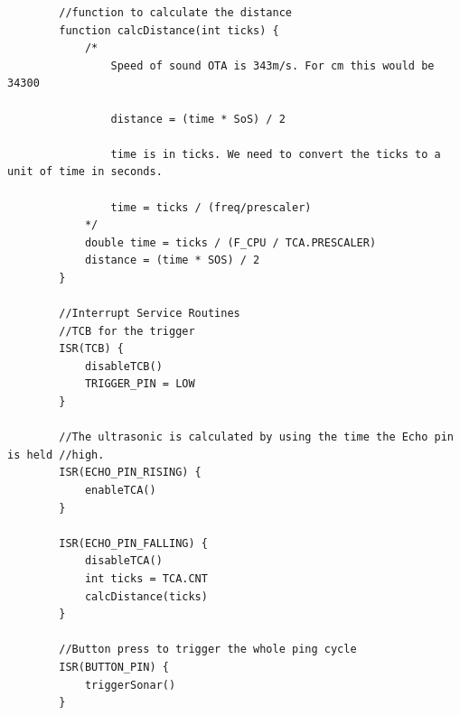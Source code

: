 \documentclass[11pt,a4paper,titlepage]{report}
\begin{document}
\begin{lstlisting}
		//function to calculate the distance
		function calcDistance(int ticks) {
			/*
				Speed of sound OTA is 343m/s. For cm this would be 34300
				
				distance = (time * SoS) / 2
				
				time is in ticks. We need to convert the ticks to a unit of time in seconds.
				
				time = ticks / (freq/prescaler) 
			*/
			double time = ticks / (F_CPU / TCA.PRESCALER)
			distance = (time * SOS) / 2
		}
		
		//Interrupt Service Routines
		//TCB for the trigger
		ISR(TCB) {
			disableTCB()
			TRIGGER_PIN = LOW
		}
		
		//The ultrasonic is calculated by using the time the Echo pin is held //high.
		ISR(ECHO_PIN_RISING) {
			enableTCA()
		}
		
		ISR(ECHO_PIN_FALLING) {
			disableTCA()
			int ticks = TCA.CNT
			calcDistance(ticks)
		}
		
		//Button press to trigger the whole ping cycle
		ISR(BUTTON_PIN) {
			triggerSonar()
		}
	\end{lstlisting}
	
\end{document}
